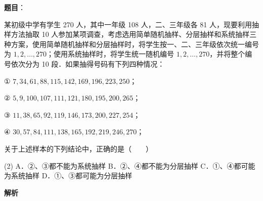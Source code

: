 \begin{answer}

\textbf{题目}：

某初级中学有学生 270 人，其中一年级 108 人，二、三年级各 81 人，现要利用抽样方法抽取 10 人参加某项调查，考虑选用简单随机抽样、分层抽样和系统抽样三种方案，使用简单随机抽样和分层抽样时，将学生按一、二、三年级依次统一编号为 $1, 2, \dots, 270$；使用系统抽样时，将学生统一随机编号 $1, 2, \dots, 270$，并将整个编号依次分为 10 段．如果抽得号码有下列四种情况：

① $7, 34, 61, 88, 115, 142, 169, 196, 223, 250$；

② $5, 9, 100, 107, 111, 121, 180, 195, 200, 265$；

③ $11, 38, 65, 92, 119, 146, 173, 200, 227, 254$；

④ $30, 57, 84, 111, 138, 165, 192, 219, 246, 270$；

关于上述样本的下列结论中，正确的是\mbox{（　　）}

\begin{gkopts}(2)
\task A．②、③都不能为系统抽样
\task B．②、④都不能为分层抽样
\task C．①、④都可能为系统抽样
\task D．①、③都可能为分层抽样
\end{gkopts}

\textbf{解析}


\end{answer}
